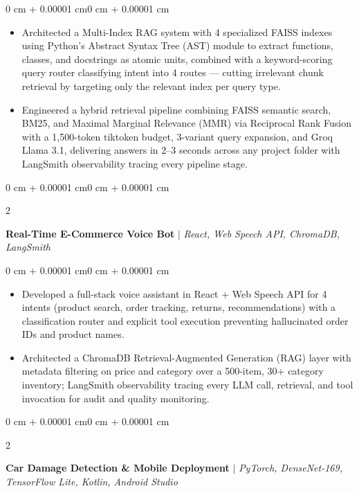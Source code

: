 \documentclass[9pt, letterpaper]{article}
\newenvironment{highlights}{
    \begin{itemize}[
        topsep=0.04 cm,
        parsep=0.04 cm,
        partopsep=0pt,
        itemsep=0pt,
        leftmargin=0 cm + 7pt
    ]
}{
    \end{itemize}
}
\newenvironment{onecolentry}{
    \begin{adjustwidth}{0 cm + 0.00001 cm}{0 cm + 0.00001 cm}
}{
    \end{adjustwidth}
}
\newenvironment{twocolentry}[2][]{
    \onecolentry
    \def\secondColumn{#2}
    \setcolumnwidth{\fill, 4.0 cm}
    \begin{paracol}{2}
}{
    \switchcolumn \raggedleft \secondColumn
    \end{paracol}
    \endonecolentry
}
\begin{document}
\begin{onecolentry}
    \begin{highlights}
        \item Architected a Multi-Index RAG system with 4 specialized FAISS indexes using Python's Abstract Syntax Tree (AST) module to extract functions, classes, and docstrings as atomic units, combined with a keyword-scoring query router classifying intent into 4 routes --- cutting irrelevant chunk retrieval by targeting only the relevant index per query type.
        \item Engineered a hybrid retrieval pipeline combining FAISS semantic search, BM25, and Maximal Marginal Relevance (MMR) via Reciprocal Rank Fusion with a 1{,}500-token tiktoken budget, 3-variant query expansion, and Groq Llama 3.1, delivering answers in 2--3 seconds across any project folder with LangSmith observability tracing every pipeline stage.
    \end{highlights}
\end{onecolentry}

\vspace{0.2 cm}

\begin{twocolentry}{}
    \textbf{Real-Time E-Commerce Voice Bot} $|$ \textit{React, Web Speech API, ChromaDB, LangSmith}
\end{twocolentry}

\vspace{0.10 cm}

\begin{onecolentry}
    \begin{highlights}
        \item Developed a full-stack voice assistant in React + Web Speech API for 4 intents (product search, order tracking, returns, recommendations) with a classification router and explicit tool execution preventing hallucinated order IDs and product names.
        \item Architected a ChromaDB Retrieval-Augmented Generation (RAG) layer with metadata filtering on price and category over a 500-item, 30+ category inventory; LangSmith observability tracing every LLM call, retrieval, and tool invocation for audit and quality monitoring.
    \end{highlights}
\end{onecolentry}

\vspace{0.2 cm}

\begin{twocolentry}{}
    \textbf{Car Damage Detection \& Mobile Deployment} $|$ \textit{PyTorch, DenseNet-169, TensorFlow Lite, Kotlin, Android Studio}
\end{twocolentry}
\end{document}
